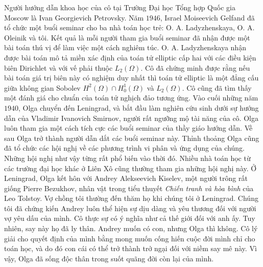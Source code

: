 \begin{multicols}{2}
\begin{figure}[H]
		\vspace*{-5pt}
	\end{figure}
	Người hướng dẫn khoa học của cô tại Trường Đại học Tổng hợp Quốc gia Moscow là Ivan Georgievich Petrovsky. Năm $1946$, Israel Moiseevich Gelfand đã tổ chức một buổi seminar cho ba nhà toán học trẻ: \linebreak O. A. Ladyzhenskaya, O. A. Oleinik và tôi. Kết quả là mỗi người tham gia buổi seminar đã nhận được một bài toán thú vị để làm việc một cách nghiêm túc. O. A. Ladyzhenskaya nhận được bài toán mô tả miền xác định của toán tử elliptic cấp hai với các điều kiện biên Dirichlet và với vế phải thuộc $L_2(\Omega)$. Cô đã chứng minh được rằng nếu  bài toán giá trị biên này có nghiệm duy nhất thì  toán tử elliptic là một đẳng cấu giữa không gian Sobolev $H^2(\Omega)\cap H^1_0(\Omega)$ và $L_2(\Omega)$. Cô  cũng đã tìm thấy một đánh giá cho chuẩn của toán tử nghịch đảo tương ứng.
	\vskip 0.1cm
	Vào cuối những năm $1940$, Olga  chuyển đến Leningrad, và bắt đầu làm nghiên cứu sinh dưới sự hướng dẫn của Vladimir Ivanovich Smirnov, người rất ngưỡng mộ tài năng của cô. Olga luôn tham gia một cách tích cực các buổi seminar của thầy giáo hướng dẫn.  Về sau Olga trở thành người dẫn dắt các buổi seminar này. Thỉnh thoảng Olga cũng đã tổ chức các hội nghị về các phương trình vi phân và ứng dụng của chúng. Những hội nghị như vậy từng rất phổ biến vào thời đó. Nhiều nhà toán học từ các trường đại học khác ở Liên Xô cũng thường tham gia những hội nghị này.
	\vskip 0.1cm
	Ở Leningrad, Olga kết hôn với Andrey Alekseevich Kiselev, một người trông rất giống Pierre Bezukhov, nhân vật trong tiểu thuyết \textit{Chiến tranh và hòa bình} của Leo Tolstoy. Vợ chồng tôi thường đến thăm họ khi chúng tôi ở Leningrad. Chúng tôi đã chứng kiến  Andrey luôn thể hiện sự dịu dàng và yêu thương đối với người vợ yêu dấu của mình. Cô thực sự có ý nghĩa như cả thế giới đối với anh ấy. Tuy nhiên, say này họ đã ly thân. Andrey muốn có con, nhưng Olga thì không. Cô lý giải cho quyết định của mình bằng mong muốn cống hiến cuộc đời mình chỉ cho toán học, và do đó con cái có thể trở thành trở ngại đối với niềm say mê này. Vì vậy, Olga đã sống độc thân trong suốt quãng đời còn lại của mình.
	\begin{figure}[H]
		\vspace*{-5pt}
		\centering
		\captionsetup{labelformat= empty, justification=centering}

\end{figure}
\end{multicols}
